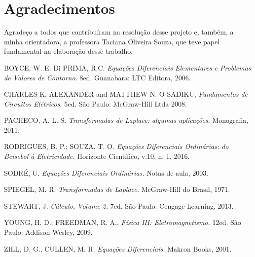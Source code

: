 \documentclass[10pt,twoside,a4paper]{article}
\begin{document}
\section{Agradecimentos} %
Agradeço a todos que contribuíram na resolução desse projeto e, também, a minha orientadora, a professora Taciana Oliveira Souza, que teve papel fundamental na elaboração desse trabalho.

\begin{thebibliography}{9} %

 BOYCE,  W. E;  Di PRIMA, R.C.  {\it Equações Diferenciais Elementares e Problemas de Valores de Contorno.}  8ed. Guanabara: LTC Editora, 2006.

 CHARLES  K.  ALEXANDER  and  MATTHEW  N.  O  SADIKU, {\it Fundamentos  de  Circuitos  Elétricos.} 5ed. São Paulo: McGraw-Hill Ltda 2008.

 PACHECO, A. L. S.  {\it Transformadas de Laplace: algumas aplicações.}  Monografia, 2011.

 RODRIGUES, B. P.; SOUZA, T. O. {\it Equações Diferenciais Ordinárias: do Beisebol à Eletricidade.} Horizonte Científico, v.10, n. 1, 2016.

 SODRÉ, U. {\it Equações Diferenciais Ordinárias.}  Notas de aula,  2003.

 SPIEGEL, M. R.  {\it Transformadas de Laplace.}   McGraw-Hill do Brasil, 1971.

 STEWART, J. {\it Cálculo, Volume 2.} 7ed. São Paulo: Cengage Learning, 2013.

 YOUNG, H. D.; FREEDMAN, R. A., {\it Física III: Eletromagnetismo.} 12ed. São Paulo: Addison Wesley, 2009.

 ZILL, D. G., CULLEN, M. R. {\it Equações Diferenciais.} Makron Books, 2001.

\end{thebibliography}

\end{document}

